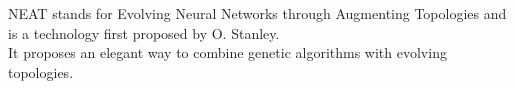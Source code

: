 NEAT stands for Evolving Neural Networks through Augmenting Topologies and is a technology first proposed by O. Stanley. \cite{Stanley2002} \\
It proposes an elegant way to combine genetic algorithms with evolving topologies.
